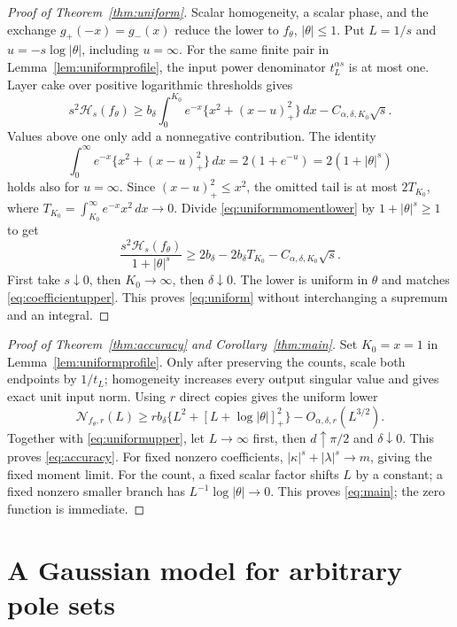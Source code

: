 \documentclass[11pt]{article}
\numberwithin{equation}{section}
\newcommand{\cH}{\mathcal H}
\newcommand{\cN}{\mathcal N}
\begin{document}
\begin{proof}[Proof of Theorem~\ref{thm:uniform}]
Scalar homogeneity, a scalar phase, and the exchange
$g_+(-x)=g_-(x)$ reduce the lower to $f_\theta$, $|\theta|\le1$.
Put $L=1/s$ and $u=-s\log|\theta|$, including $u=\infty$.
For the same finite pair in Lemma~\ref{lem:uniformprofile}, the input
power denominator $t_L^{\alpha s}$ is at most one. Layer cake over
positive logarithmic thresholds gives
\begin{equation}\label{eq:uniformmomentlower}
 s^2\cH_s(f_\theta)\ge
 b_\delta\int_0^{K_0}e^{-x}\{x^2+(x-u)_+^2\}\,dx
                    -C_{\alpha,\delta,K_0}\sqrt s.
\end{equation}
Values above one only add a nonnegative contribution. The identity
\[
 \int_0^\infty e^{-x}\{x^2+(x-u)_+^2\}\,dx
        =2(1+e^{-u})=2(1+|\theta|^s)
\]
holds also for $u=\infty$. Since $(x-u)_+^2\le x^2$, the omitted
tail is at most $2T_{K_0}$, where
$T_{K_0}=\int_{K_0}^\infty e^{-x}x^2\,dx\to0$.
Divide \eqref{eq:uniformmomentlower} by $1+|\theta|^s\ge1$ to get
\[
 \frac{s^2\cH_s(f_\theta)}{1+|\theta|^s}
 \ge2b_\delta-2b_\delta T_{K_0}
                       -C_{\alpha,\delta,K_0}\sqrt s.
\]
First take $s\downarrow0$, then $K_0\to\infty$, then
$\delta\downarrow0$. The lower is uniform in $\theta$ and matches
\eqref{eq:coefficientupper}. This proves \eqref{eq:uniform} without
interchanging a supremum and an integral.
\end{proof}

\begin{proof}[Proof of Theorem~\ref{thm:accuracy} and
Corollary~\ref{thm:main}]
Set $K_0=x=1$ in Lemma~\ref{lem:uniformprofile}. Only after preserving
the counts, scale both endpoints by $1/t_L$; homogeneity increases
every output singular value and gives exact unit input norm.
Using $r$ direct copies gives the uniform lower
\[
 \cN_{f_\theta,r}(L)\ge
 r b_\delta\{L^2+[L+\log|\theta|]_+^2\}
                        -O_{\alpha,\delta,r}(L^{3/2}).
\]
Together with \eqref{eq:uniformupper}, let $L\to\infty$ first, then
$d\uparrow\pi/2$ and $\delta\downarrow0$.
This proves \eqref{eq:accuracy}. For fixed nonzero coefficients,
$|\kappa|^s+|\lambda|^s\to m$, giving the fixed moment limit.
For the count, a fixed scalar factor shifts $L$ by a constant;
a fixed nonzero smaller branch has $L^{-1}\log|\theta|\to0$.
This proves \eqref{eq:main}; the zero function is immediate.
\end{proof}

\section{A Gaussian model for arbitrary pole sets}
\end{document}
